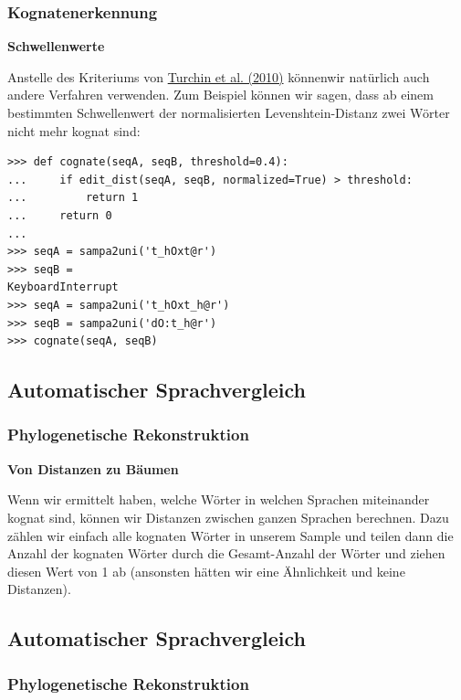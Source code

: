 \subsubsection{\texorpdfstring{{Kognatenerkennung}}{Kognatenerkennung}}

\textbf{Schwellenwerte}

Anstelle des Kriteriums von
\href{http://bibliography.lingpy.org?key=Turchin2010}{Turchin et al.
(2010)} könnenwir natürlich auch andere Verfahren verwenden. Zum
Beispiel können wir sagen, dass ab einem bestimmten Schwellenwert der
normalisierten Levenshtein-Distanz zwei Wörter nicht mehr kognat sind:

\begin{verbatim}
>>> def cognate(seqA, seqB, threshold=0.4):
...     if edit_dist(seqA, seqB, normalized=True) > threshold:
...         return 1
...     return 0
... 
>>> seqA = sampa2uni('t_hOxt@r')
>>> seqB = 
KeyboardInterrupt
>>> seqA = sampa2uni('t_hOxt_h@r')
>>> seqB = sampa2uni('dO:t_h@r')
>>> cognate(seqA, seqB)
\end{verbatim}

\subsection{\texorpdfstring{{Automatischer
Sprachvergleich}}{Automatischer Sprachvergleich}}

\subsubsection{\texorpdfstring{{Phylogenetische
Rekonstruktion}}{Phylogenetische Rekonstruktion}}

\textbf{Von Distanzen zu Bäumen}

Wenn wir ermittelt haben, welche Wörter in welchen Sprachen miteinander
kognat sind, können wir Distanzen zwischen ganzen Sprachen berechnen.
Dazu zählen wir einfach alle kognaten Wörter in unserem Sample und
teilen dann die Anzahl der kognaten Wörter durch die Gesamt-Anzahl der
Wörter und ziehen diesen Wert von 1 ab (ansonsten hätten wir eine
Ähnlichkeit und keine Distanzen).

\subsection{\texorpdfstring{{Automatischer
Sprachvergleich}}{Automatischer Sprachvergleich}}

\subsubsection{\texorpdfstring{{Phylogenetische
Rekonstruktion}}{Phylogenetische Rekonstruktion}}

